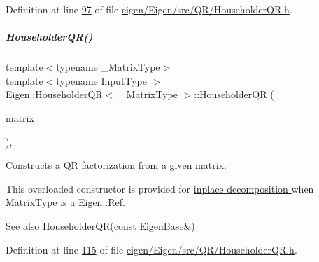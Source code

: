 Definition at line \hyperlink{eigen_2_eigen_2src_2_q_r_2_householder_q_r_8h_source_l00097}{97} of file \hyperlink{eigen_2_eigen_2src_2_q_r_2_householder_q_r_8h_source}{eigen/\+Eigen/src/\+Q\+R/\+Householder\+Q\+R.\+h}.

\mbox{\label{group___q_r___module_a95a53f8479ee147d7b0ccab71c13e45d}} 
\subparagraph{\texorpdfstring{Householder\+Q\+R()}{HouseholderQR()}\hspace{0.1cm}{\footnotesize\ttfamily [4/8]}}
{\footnotesize\ttfamily template$<$typename \+\_\+\+Matrix\+Type$>$ \\
template$<$typename Input\+Type $>$ \\
\hyperlink{group___q_r___module_class_eigen_1_1_householder_q_r}{Eigen\+::\+Householder\+QR}$<$ \+\_\+\+Matrix\+Type $>$\+::\hyperlink{group___q_r___module_class_eigen_1_1_householder_q_r}{Householder\+QR} (\begin{DoxyParamCaption}\item[{\hyperlink{group___core___module_struct_eigen_1_1_eigen_base}{Eigen\+Base}$<$ Input\+Type $>$ \&}]{matrix }\end{DoxyParamCaption})\hspace{0.3cm}{\ttfamily [inline]}, {\ttfamily [explicit]}}



Constructs a QR factorization from a given matrix. 

This overloaded constructor is provided for \hyperlink{group___inplace_decomposition}{inplace decomposition } when {\ttfamily Matrix\+Type} is a \hyperlink{group___core___module_class_eigen_1_1_ref}{Eigen\+::\+Ref}.

\begin{DoxySeeAlso}{See also}
Householder\+Q\+R(const Eigen\+Base\&) 
\end{DoxySeeAlso}


Definition at line \hyperlink{eigen_2_eigen_2src_2_q_r_2_householder_q_r_8h_source_l00115}{115} of file \hyperlink{eigen_2_eigen_2src_2_q_r_2_householder_q_r_8h_source}{eigen/\+Eigen/src/\+Q\+R/\+Householder\+Q\+R.\+h}.

